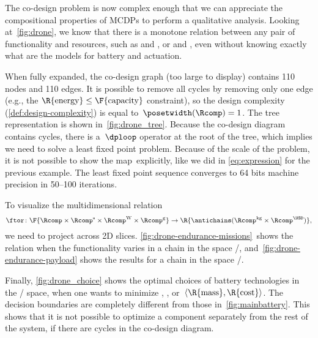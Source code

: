The co-design problem is now complex enough that we can appreciate
the compositional properties of MCDPs to perform a qualitative analysis.
Looking at~\cref{fig:drone}, we know that there is a monotone relation
between any pair of functionality and resources, such as 
and , or  and , even without knowing
exactly what are the models for battery and actuation.

When fully expanded, the co-design graph (too large to display) contains
110 nodes and 110 edges. It is possible to remove all cycles by removing
only one edge (e.g., the $\R{\text{energy}}\leq\text{\F{\text{capacity}}}$
constraint), so the design complexity (\cref{def:design-complexity})
is equal to~$\posetwidth(\Rcomp)=1$. The
tree representation is shown in~\cref{fig:drone_tree}. Because the
co-design diagram contains cycles, there is a~$\dploop$ operator
at the root of the tree, which implies we need to solve a least fixed
point problem. Because of the scale of the problem, it is not possible
to show the map~\ftor explicitly, like we did in \cref{eq:expression}
for the previous example. The least fixed point sequence converges
to 64 bits machine precision in 50--100 iterations.

To visualize the multidimensional relation
\[
  \ftor\colon\F{\Rcomp\times\Rcomp^{\text{s}}\times\Rcomp^{\text{W}}\times\Rcomp^{\text{g}}}\rightarrow\R{\antichains(\Rcomp^{\text{kg}}\times\Rcomp^{\USD})},
\]
we need to project across 2D slices. \cref{fig:drone-endurance-missions}~shows
the relation when the functionality varies in a chain in the space
/, and~\cref{fig:drone-endurance-payload}
shows the results for a chain in the space /.

Finally, \cref{fig:drone_choice} shows the optimal choices of battery
technologies in the / space, when one
wants to minimize , , or~$\left\langle \R{\text{mass}},\R{\text{cost}}\right\rangle $.
The decision boundaries are completely different from those in~\cref{fig:mainbattery}.
This shows that it is not possible to optimize a component separately
from the rest of the system, if there are cycles in the co-design
diagram.

